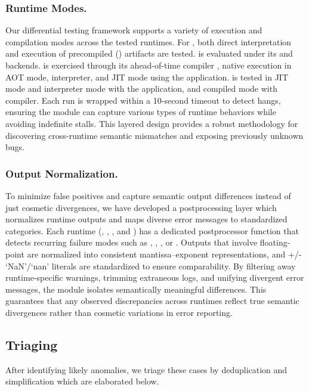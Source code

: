 \documentclass[lettersize,journal]{IEEEtran}
\begin{document}
\subsubsection{Runtime Modes.} Our differential testing framework supports a variety of execution and compilation modes across the tested runtimes. For \wasmtime{}, both direct interpretation and execution of precompiled () artifacts are tested. \wasmer{} is evaluated under its  and  backends. \wamr{} is exercised through its ahead-of-time compiler , native execution in AOT mode, interpreter, and JIT mode using the  application. \wasmedge{} is tested in JIT mode and interpreter mode with the  application, and compiled mode with  compiler. Each run is wrapped within a 10-second timeout to detect hangs, ensuring the module can capture various types of runtime behaviors while avoiding indefinite stalls. This layered design provides a robust methodology for discovering cross-runtime semantic mismatches and exposing previously unknown bugs.

\subsubsection{Output Normalization.} To minimize false positives and capture semantic output differences instead of just cosmetic divergences, we have developed a postprocessing layer which normalizes runtime outputs and maps diverse error messages to standardized categories. Each runtime (\wasmtime{}, \wasmer{}, \wamr{}, and \wasmedge{}) has a dedicated postprocessor function that detects recurring failure modes such as , , , or . Outputs that involve floating-point are normalized into consistent mantissa–exponent representations, and +/- `NaN'/`nan' literals are standardized to ensure comparability. By filtering away runtime-specific warnings, trimming extraneous logs, and unifying divergent error messages, the module isolates semantically meaningful differences. This guarantees that any observed discrepancies across runtimes reflect true semantic divergences rather than cosmetic variations in error reporting.


\subsection{Triaging}
After identifying likely anomalies, we triage these cases by deduplication and simplification which are elaborated below.
\label{sec:triaging}
\end{document}
